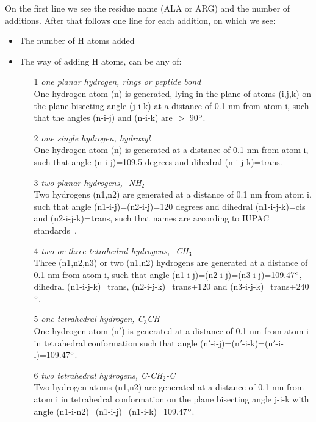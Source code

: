 On the first line we see the residue name (ALA or ARG) and the number
of additions. After that follows one line for each addition, on which
we see:
\begin{itemize}
\item The number of H atoms added
\item The way of adding H atoms, can be any of:
\begin{enumerate}
\item[1]{\em one planar hydrogen, {\eg} rings or peptide bond}\\
One hydrogen atom (n) is generated, lying in the plane of atoms
(i,j,k) on the plane bisecting angle (j-i-k) at a distance of 0.1 nm
from atom i, such that the angles (n-i-j) and (n-i-k) are $>$ 90$^{\rm o}$.

\item[2]{\em one single hydrogen, {\eg} hydroxyl}\\
One hydrogen atom (n) is generated at a distance of 0.1 nm from atom
i, such that angle (n-i-j)=109.5 degrees and dihedral (n-i-j-k)=trans.

\item[3]{\em two planar hydrogens, {\eg} -NH{$_2$}}\\
Two hydrogens (n1,n2) are generated at a distance of 0.1 nm from atom
i, such that angle (n1-i-j)=(n2-i-j)=120 degrees and dihedral
(n1-i-j-k)=cis and (n2-i-j-k)=trans, such that names are according to
IUPAC standards~\cite{iupac70}.

\item[4]{\em two or three tetrahedral hydrogens, {\eg} -CH{$_3$}}\\
Three (n1,n2,n3) or two (n1,n2) hydrogens are generated at a distance
of 0.1 nm from atom i, such that angle
(n1-i-j)=(n2-i-j)=(n3-i-j)=109.47$^{\rm o}$, dihedral (n1-i-j-k)=trans,
(n2-i-j-k)=trans+120 and (n3-i-j-k)=trans+240$^{\rm o}$.

\item[5]{\em one tetrahedral hydrogen, {\eg} C{$_3$}CH}\\
One hydrogen atom (n$\prime$) is generated at a distance of 0.1 nm from atom
i in tetrahedral conformation such that angle
(n$\prime$-i-j)=(n$\prime$-i-k)=(n$\prime$-i-l)=109.47$^{\rm o}$.

\item[6]{\em two tetrahedral hydrogens, {\eg} C-CH{$_2$}-C}\\
Two hydrogen atoms (n1,n2) are generated at a distance of 0.1 nm from
atom i in tetrahedral conformation on the plane bisecting angle j-i-k
with angle (n1-i-n2)=(n1-i-j)=(n1-i-k)=109.47$^{\rm o}$.


\end{enumerate}
\end{itemize}
